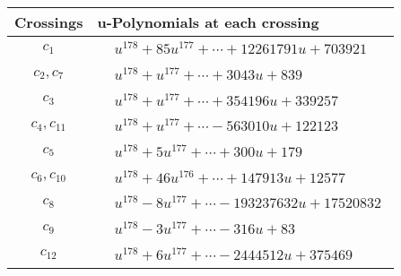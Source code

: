\documentclass[1p]{elsarticle_modified}
\theoremstyle{definition}
\begin{document}
\begin{tabular}{m{50pt}|m{274pt}}
Crossings & \hspace{64pt}u-Polynomials at each crossing \\
\hline $$\begin{aligned}c_{1}\end{aligned}$$&$\begin{aligned}
&u^{178}+85 u^{177}+\cdots+12261791 u+703921
\end{aligned}$\\
\hline $$\begin{aligned}c_{2},c_{7}\end{aligned}$$&$\begin{aligned}
&u^{178}+u^{177}+\cdots+3043 u+839
\end{aligned}$\\
\hline $$\begin{aligned}c_{3}\end{aligned}$$&$\begin{aligned}
&u^{178}+u^{177}+\cdots+354196 u+339257
\end{aligned}$\\
\hline $$\begin{aligned}c_{4},c_{11}\end{aligned}$$&$\begin{aligned}
&u^{178}+u^{177}+\cdots-563010 u+122123
\end{aligned}$\\
\hline $$\begin{aligned}c_{5}\end{aligned}$$&$\begin{aligned}
&u^{178}+5 u^{177}+\cdots+300 u+179
\end{aligned}$\\
\hline $$\begin{aligned}c_{6},c_{10}\end{aligned}$$&$\begin{aligned}
&u^{178}+46 u^{176}+\cdots+147913 u+12577
\end{aligned}$\\
\hline $$\begin{aligned}c_{8}\end{aligned}$$&$\begin{aligned}
&u^{178}-8 u^{177}+\cdots-193237632 u+17520832
\end{aligned}$\\
\hline $$\begin{aligned}c_{9}\end{aligned}$$&$\begin{aligned}
&u^{178}-3 u^{177}+\cdots-316 u+83
\end{aligned}$\\
\hline $$\begin{aligned}c_{12}\end{aligned}$$&$\begin{aligned}
&u^{178}+6 u^{177}+\cdots-2444512 u+375469
\end{aligned}$\\
\hline
\end{tabular}\\~\\
\end{document}
